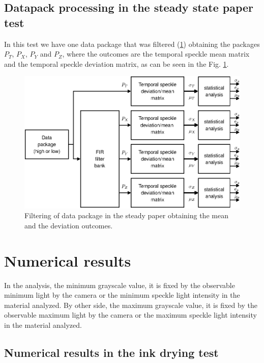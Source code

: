 \documentclass[review]{elsarticle}
\begin{document}
\subsection{Datapack processing in the steady state paper test}
\label{subsec:numprocink}

In this test we have one data package that was filtered (\ref{fig:filtering2}) 
obtaining the packages $P_T$, $P_X$, $P_Y$ and $P_Z$, where the outcomes are the temporal speckle mean matrix and the 
temporal speckle deviation matrix, as can be seen in the Fig. \ref{fig:filtering2}.

\begin{figure}[h!]
\centering
\includegraphics[width=0.65\columnwidth]{filtering2.eps}
\caption{Filtering of data package in the steady paper obtaining the mean and the deviation outcomes.}
\label{fig:filtering2}
\end{figure}




\section{Numerical results} 
\label{sec:numerical}


In the analysis, the minimum grayscale value, 
it is fixed by the observable minimum light by the camera or the minimum speckle light intensity in the material analyzed.
By other side, the maximum grayscale value, 
it is fixed by the observable maximum light by the camera or the maximum speckle light intensity in the material analyzed.

\subsection{Numerical results in the ink drying test} 
\label{subsec:numericalink}
\end{document}
